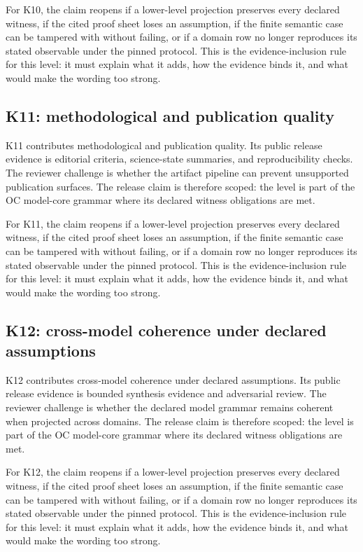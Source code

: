 For K10, the claim reopens if a lower-level projection preserves every declared witness, if the cited proof sheet loses an assumption, if the finite semantic case can be tampered with without failing, or if a domain row no longer reproduces its stated observable under the pinned protocol. This is the evidence-inclusion rule for this level: it must explain what it adds, how the evidence binds it, and what would make the wording too strong.


\subsection{K11: methodological and publication quality}

K11 contributes methodological and publication quality. Its public release evidence is editorial criteria, science-state summaries, and reproducibility checks. The reviewer challenge is whether the artifact pipeline can prevent unsupported publication surfaces. The release claim is therefore scoped: the level is part of the OC model-core grammar where its declared witness obligations are met.


For K11, the claim reopens if a lower-level projection preserves every declared witness, if the cited proof sheet loses an assumption, if the finite semantic case can be tampered with without failing, or if a domain row no longer reproduces its stated observable under the pinned protocol. This is the evidence-inclusion rule for this level: it must explain what it adds, how the evidence binds it, and what would make the wording too strong.


\subsection{K12: cross-model coherence under declared assumptions}

K12 contributes cross-model coherence under declared assumptions. Its public release evidence is bounded synthesis evidence and adversarial review. The reviewer challenge is whether the declared model grammar remains coherent when projected across domains. The release claim is therefore scoped: the level is part of the OC model-core grammar where its declared witness obligations are met.


For K12, the claim reopens if a lower-level projection preserves every declared witness, if the cited proof sheet loses an assumption, if the finite semantic case can be tampered with without failing, or if a domain row no longer reproduces its stated observable under the pinned protocol. This is the evidence-inclusion rule for this level: it must explain what it adds, how the evidence binds it, and what would make the wording too strong.


